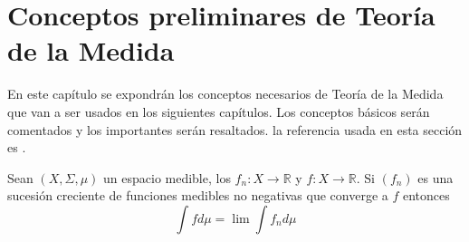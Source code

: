 \chapter{Conceptos preliminares de Teoría de la Medida}

En este capítulo se expondrán los conceptos necesarios de Teoría de la Medida que van a ser usados en los siguientes capítulos. Los conceptos básicos serán comentados y los importantes serán resaltados. la referencia usada en esta sección es \cite{bartle}.

\begin{teorema}\label{convergencia_monotona}
	Sean $(X,\Sigma,\mu)$ un espacio medible, los $f_n: X \rightarrow \mathbb{R}$ y $f: X \rightarrow \mathbb{R}$. Si $(f_n)$ es una sucesión creciente de funciones medibles no negativas que converge a $f$ entonces
	\begin{equation}
		\int f d\mu = \lim \int f_n d\mu
	\end{equation}
\end{teorema}


